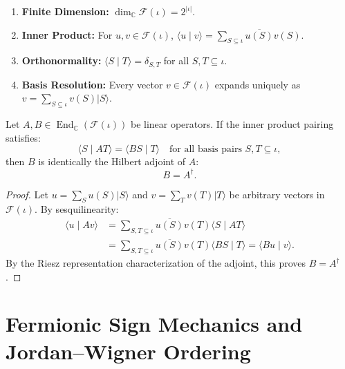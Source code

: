 \begin{proposition}
\label{prop:fock_carrier_properties}
\begin{enumerate}
    \item \textbf{Finite Dimension:} $\dim_{\mathbb{C}} \mathcal{F}(\iota) = 2^{|\iota|}$.
    \item \textbf{Inner Product:} For $u, v \in \mathcal{F}(\iota)$, $\langle u \mid v \rangle = \sum_{S \subseteq \iota} \overline{u(S)} v(S)$.
    \item \textbf{Orthonormality:} $\langle S \mid T \rangle = \delta_{S, T}$ for all $S, T \subseteq \iota$.
    \item \textbf{Basis Resolution:} Every vector $v \in \mathcal{F}(\iota)$ expands uniquely as $v = \sum_{S \subseteq \iota} v(S) |S\rangle$.
\end{enumerate}
\end{proposition}

\begin{lemma}
\label{lem:adjoint_pairing}
Let $A, B \in \operatorname{End}_{\mathbb{C}}(\mathcal{F}(\iota))$ be linear operators. If the inner product pairing satisfies:
\begin{equation}
\langle S \mid A T \rangle = \langle B S \mid T \rangle \quad \text{for all basis pairs } S, T \subseteq \iota,
\end{equation}
then $B$ is identically the Hilbert adjoint of $A$:
\begin{equation}
B = A^\dagger.
\end{equation}
\end{lemma}

\begin{proof}
Let $u = \sum_S u(S) |S\rangle$ and $v = \sum_T v(T) |T\rangle$ be arbitrary vectors in $\mathcal{F}(\iota)$. By sesquilinearity:
\begin{align*}
\langle u \mid A v \rangle &= \sum_{S, T \subseteq \iota} \overline{u(S)} v(T) \langle S \mid A T \rangle \\
&= \sum_{S, T \subseteq \iota} \overline{u(S)} v(T) \langle B S \mid T \rangle = \langle B u \mid v \rangle.
\end{align*}
By the Riesz representation characterization of the adjoint, this proves $B = A^\dagger$.
\end{proof}

\section{Fermionic Sign Mechanics and Jordan--Wigner Ordering}

